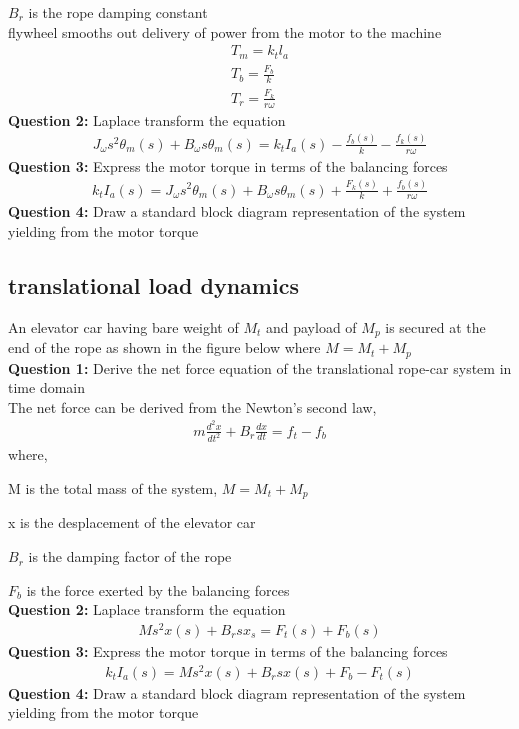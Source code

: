 \documentclass[10pt,a4paper]{report}
\begin{document}
$B_{r}$ is the rope damping constant\\
flywheel smooths out delivery of power from the motor to the machine\\
\begin{eqnarray}
  T_{m} = k_{t}l_{a}\\
  T_{b} = \frac{F_{b}}{k}\\
  T_{r} = \frac{F_{k}}{r\omega}
\end{eqnarray}
\textbf{Question 2:}
Laplace transform the equation\\
\begin{eqnarray}
  J_{\omega}s^2\theta_{m}(s) + B_{\omega}s\theta_{m}(s) = k_{t}I_{a}(s) - \frac{f_{b}(s)}{k} - \frac{f_{k}(s)}{r\omega}
\end{eqnarray}
\textbf{Question 3:}
Express the motor torque in terms of the balancing forces\\
\begin{eqnarray}
  k_{t}I_{a}(s) = J_{\omega}s^2 \theta_{m}(s) + B_{\omega}s\theta_{m}(s) + \frac{F_{k}(s)}{k} + \frac{f_{b}(s)}{r\omega}
\end{eqnarray}
\textbf{Question 4:}
Draw a standard block diagram representation of the system yielding from the motor torque\\
\subsection{translational load dynamics}
An elevator car having bare weight of $M_{t}$ and payload of $M_{p}$ is secured at the end of the rope as shown in the figure  below where $M = M_{t} + M_{p}$\\
\textbf{Question 1:}
Derive the net force equation of the translational rope-car system in time domain\\
The net force can be derived from the Newton's second law,\\
\begin{eqnarray}
  m\frac{d^2x}{dt^2} + B_{r}\frac{dx}{dt} = f_{t} -  f_{b}
\end{eqnarray}
where,

M is the total mass of the system, $M = M_{t} + M_{p}$

x is the desplacement of the elevator car

$B_{r}$ is the damping factor of the rope

$F_{b}$ is the force exerted by the balancing forces\\
\textbf{Question 2:}
Laplace transform the equation
\begin{eqnarray}
  Ms^2x(s) + B_{r}sx_{s} = F_{t}(s) + F_{b}(s)
\end{eqnarray}
\textbf{Question 3:}
Express the motor torque in terms of the balancing forces
\begin{eqnarray}
  k_{t}I_{a}(s) = Ms^2x(s) + B_{r}sx(s) + F_{b} -F_{t}(s)
\end{eqnarray}
\textbf{Question 4:}
Draw a standard block diagram representation of the system yielding from the motor torque
\end{document}
